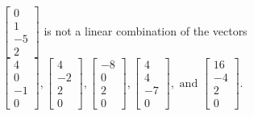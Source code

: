 \begin{exercise}
\begin{exerciseStatement}
  \end{exerciseStatement}
  \begin{exerciseAnswer}
   \(\left[\begin{array}{c}
0 \\
1 \\
-5 \\
2
\end{array}\right]\) 
  	 is not  
	a linear combination of the vectors \(\left[\begin{array}{c}
4 \\
0 \\
-1 \\
0
\end{array}\right] , \left[\begin{array}{c}
4 \\
-2 \\
2 \\
0
\end{array}\right] , \left[\begin{array}{c}
-8 \\
0 \\
2 \\
0
\end{array}\right] , \left[\begin{array}{c}
4 \\
4 \\
-7 \\
0
\end{array}\right] , \text{ and } \left[\begin{array}{c}
16 \\
-4 \\
2 \\
0
\end{array}\right]\).

	
  


  \end{exerciseAnswer}
\end{exercise}
